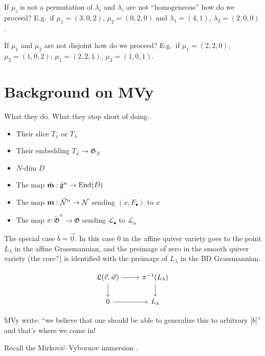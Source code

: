 \documentclass{article}
\begin{document}
\begin{question}
If $\mu_i$ is not a permutation of $\lambda_i$ and $\lambda_i$ are not ``homogeneous'' how do we proceed? E.g.\ if $\mu_1 = (3,0,2)$, $\mu_2 = (0,2,0)$ and $\lambda_1 = (4,1)$, $\lambda_2 = (2,0,0)$. 
\end{question}

\begin{question}
If $\mu_1$ and $\mu_2$ are not disjoint how do we proceed? E.g.\ if $\mu_1 = (2,2,0)$, $\mu_2 = (1,0,2)$; $\mu_1 = (2,2,1)$, $\mu_2 = (1,0,1)$.
\end{question}

\section{Background on MVy}

What they do. What they stop short of doing. 

\begin{itemize}
    \item Their slice $T_x$ or $T_\lambda$
    \item Their embedding $T_x\to\mathfrak G_N$
    \item $N$-dim $D$
    \item The map $\tilde {\bf m}:\tilde{\mathfrak g}^{n}\to\operatorname{End}(D)$
    \item The map ${\bf m} : \tilde{\mathcal N}^n\to\mathcal N$ sending $(x,F_\bullet)$ to $x$
    \item The map $\pi: \tilde{\mathfrak G}^n\to \mathfrak G$ sending $\mathcal L_\bullet$ to $\mathcal L_n$
\end{itemize}


The special case $b = \vec 0$. In this case $0$ in the affine quiver variety goes to the point $L_\lambda$ in the affine Grassmannian, and the preimage of zero in the smooth quiver variety (the core?) is identified with the preimage of $L_\lambda$ in the BD Grassmannian. 

\[
\begin{tikzcd}
    \mathfrak L(\vec v,\vec w) \ar[r] \ar[d] & \pi^{-1} (L_\lambda)\ar[d] \\
     0 \ar[r] & L_\lambda
\end{tikzcd}    
\]

MVy write: ``we believe that one should be able to generalize this to arbitrary [$b$]'' and that's where we come in!

Recall the Mirkovi\'c--Vybornov immersion \cite[Theorems 1.2 and 5.3]{mirkovic2007quiver}. 
\end{document}
